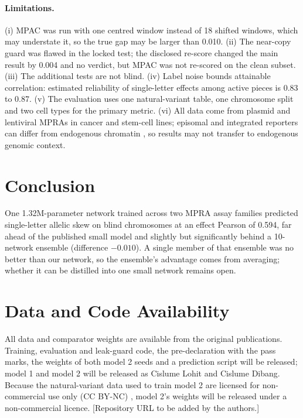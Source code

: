 \documentclass[11pt]{article}
\begin{document}
\paragraph{Limitations.} (i) MPAC was run with one centred window instead of 18 shifted windows, which may understate it, so the true gap may be larger than 0.010. (ii) The near-copy guard was flawed in the locked test; the disclosed re-score changed the main result by 0.004 and no verdict, but MPAC was not re-scored on the clean subset. (iii) The additional tests are not blind. (iv) Label noise bounds attainable correlation: estimated reliability of single-letter effects among active pieces is 0.83 to 0.87. (v) The evaluation uses one natural-variant table, one chromosome split and two cell types for the primary metric. (vi) All data come from plasmid and lentiviral MPRAs in cancer and stem-cell lines; episomal and integrated reporters can differ from endogenous chromatin \cite{inoue2016systematic}, so results may not transfer to endogenous genomic context.

\section{Conclusion}
\label{sec:conclusion}

One 1.32M-parameter network trained across two MPRA assay families predicted single-letter allelic skew on blind chromosomes at an effect Pearson of 0.594, far ahead of the published small model and slightly but significantly behind a 10-network ensemble (difference $-0.010$). A single member of that ensemble was no better than our network, so the ensemble's advantage comes from averaging; whether it can be distilled into one small network remains open.

\section*{Data and Code Availability}

All data \cite{agarwal2025massively,siraj2026functional,kircher2019saturation,benegas2025benchmarking} and comparator weights \cite{agarwal2025massively,butts2025identifying} are available from the original publications. Training, evaluation and leak-guard code, the pre-declaration with the pass marks, the weights of both model 2 seeds and a prediction script will be released; model 1 and model 2 will be released as Cislume Lohit and Cislume Dibang. Because the natural-variant data used to train model 2 are licensed for non-commercial use only (CC BY-NC) \cite{siraj2026functional}, model 2's weights will be released under a non-commercial licence. [Repository URL to be added by the authors.]
\end{document}
